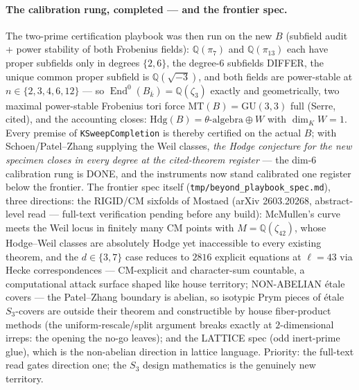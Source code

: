 \documentclass[11pt]{article}
\theoremstyle{definition}
\theoremstyle{remark}
\begin{document}
\paragraph{The calibration rung, completed --- and the frontier
spec.}  The two-prime certification playbook was then run on the new
$B$ (subfield audit + power stability of both Frobenius fields):
$\mathbb{Q}(\pi_7)$ and $\mathbb{Q}(\pi_{13})$ each have proper
subfields only in degrees $\{2,6\}$, the degree-$6$ subfields
DIFFER, the unique common proper subfield is
$\mathbb{Q}(\sqrt{-3})$, and both fields are power-stable at
$n\in\{2,3,4,6,12\}$ --- so $\operatorname{End}^0(B_{\bar k})
=\mathbb{Q}(\zeta_3)$ exactly and geometrically, two maximal
power-stable Frobenius tori force $\mathrm{MT}(B)=\mathrm{GU}(3,3)$
full (Serre, cited), and the accounting closes:
$\mathrm{Hdg}(B)=\theta\text{-algebra}\oplus W$ with
$\dim_K W=1$.  Every premise of \texttt{KSweepCompletion} is thereby
certified on the actual $B$; with Schoen/Patel--Zhang supplying the
Weil classes, \emph{the Hodge conjecture for the new specimen closes
in every degree at the cited-theorem register} --- the dim-6
calibration rung is DONE, and the instruments now stand calibrated
one register below the frontier.  The frontier spec itself
(\texttt{tmp/beyond\_playbook\_spec.md}), three directions: the
RIGID/CM sixfolds of Mostaed (arXiv 2603.20268, abstract-level read
--- full-text verification pending before any build): McMullen's
curve meets the Weil locus in finitely many CM points with
$M=\mathbb{Q}(\zeta_{42})$, whose Hodge--Weil classes are absolutely
Hodge yet inaccessible to every existing theorem, and the $d\in\{3,7\}$
case reduces to $2816$ explicit equations at $\ell=43$ via Hecke
correspondences --- CM-explicit and character-sum countable, a
computational attack surface shaped like house territory;
NON-ABELIAN \'etale covers --- the Patel--Zhang boundary is
abelian, so isotypic Prym pieces of \'etale $S_3$-covers are outside
their theorem and constructible by house fiber-product methods (the
uniform-rescale/split argument breaks exactly at $2$-dimensional
irreps: the opening the no-go leaves); and the LATTICE spec (odd
inert-prime glue), which is the non-abelian direction in lattice
language.  Priority: the full-text read gates direction one; the
$S_3$ design mathematics is the genuinely new territory.
\end{document}
